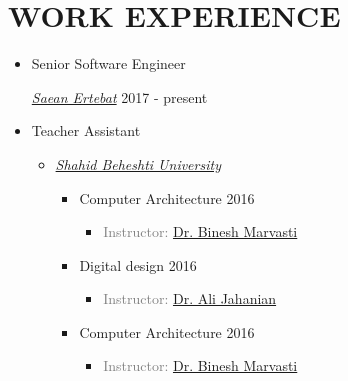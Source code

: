 \documentclass[10pt,a4paper,sans]{moderncv} %
\begin{document}
	\section{WORK EXPERIENCE}
	\begin{itemize}
		\item Senior Software Engineer
		\begin{itemize}
    		\href{http://www.senatelecom.com/}{ \emph{Saean Ertebat}} \hfill 2017 - present
    	\end{itemize}
    \end{itemize}

	\begin{itemize}
		\item Teacher Assistant
		\begin{itemize}
    		\item \href{https://sbu.ac.ir/Cols/CSE/Pages/default.aspx/}{ \emph{Shahid Beheshti University}}
    		
			\begin{itemize}
			    \item Computer Architecture \hfill 2016
    			\begin{itemize}
    				\item \textcolor{gray}{Instructor: \href{mailto:marvasti@khu.ac.ir}{Dr. Binesh Marvasti}}
    			\end{itemize}
    		\end{itemize}
        	
        	\begin{itemize}
    			\item Digital design \hfill 2016
    			\begin{itemize}
    				\item \textcolor{gray}{Instructor: \href{mailto:jahanian@sbu.ac.ir}{Dr. Ali Jahanian}}
    			\end{itemize}
    		\end{itemize}

        	\begin{itemize}
    			\item Computer Architecture \hfill 2016
    			\begin{itemize}
    				\item \textcolor{gray}{Instructor: \href{mailto:marvasti@khu.ac.ir}{Dr. Binesh Marvasti}}
    			\end{itemize}
    		\end{itemize}
		\end{itemize}
	\end{itemize}
\end{document}
